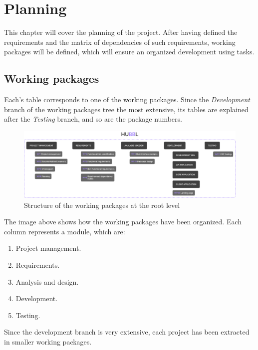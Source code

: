 \documentclass[a4paper, 12pt, oneside]{book}
\begin{document}
\chapter{Planning}
This chapter will cover the planning of the project. After having defined the requirements and the matrix of dependencies of such requirements, working packages will be defined, which will ensure an organized development using tasks.
\section{Working packages}
Each's table corresponds to one of the working packages. Since the \emph{Development} branch of the working packages tree the most extensive, its tables are explained after the \emph{Testing} branch, and so are the package numbers.
\begin{figure}[H]
	\centering
	\includegraphics[width=\textwidth]{assets/working-packages/All.png}
	\caption{Structure of the working packages at the root level}
\end{figure}
The image above shows how the working packages have been organized. Each column represents a module, which are:
\begin{enumerate}[label = -]
	\item Project management.
	\item Requirements.
	\item Analysis and design.
	\item Development.
	\item Testing.
\end{enumerate}
Since the development branch is very extensive, each project has been extracted in smaller working packages.
\end{document}
